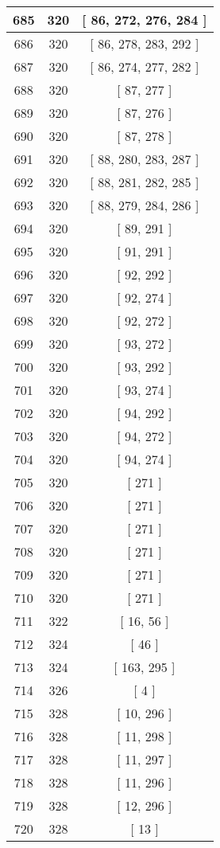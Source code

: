 \begin{center}
\begin{longtable}[H]{|| c c c ||}
685 & 320 & [ 86, 272, 276, 284 ]
\\\hline
686 & 320 & [ 86, 278, 283, 292 ]
\\\hline
687 & 320 & [ 86, 274, 277, 282 ]
\\\hline
688 & 320 & [ 87, 277 ]
\\\hline
689 & 320 & [ 87, 276 ]
\\\hline
690 & 320 & [ 87, 278 ]
\\\hline
691 & 320 & [ 88, 280, 283, 287 ]
\\\hline
692 & 320 & [ 88, 281, 282, 285 ]
\\\hline
693 & 320 & [ 88, 279, 284, 286 ]
\\\hline
694 & 320 & [ 89, 291 ]
\\\hline
695 & 320 & [ 91, 291 ]
\\\hline
696 & 320 & [ 92, 292 ]
\\\hline
697 & 320 & [ 92, 274 ]
\\\hline
698 & 320 & [ 92, 272 ]
\\\hline
699 & 320 & [ 93, 272 ]
\\\hline
700 & 320 & [ 93, 292 ]
\\\hline
701 & 320 & [ 93, 274 ]
\\\hline
702 & 320 & [ 94, 292 ]
\\\hline
703 & 320 & [ 94, 272 ]
\\\hline
704 & 320 & [ 94, 274 ]
\\\hline
705 & 320 & [ 271 ]
\\\hline
706 & 320 & [ 271 ]
\\\hline
707 & 320 & [ 271 ]
\\\hline
708 & 320 & [ 271 ]
\\\hline
709 & 320 & [ 271 ]
\\\hline
710 & 320 & [ 271 ]
\\\hline
711 & 322 & [ 16, 56 ]
\\\hline
712 & 324 & [ 46 ]
\\\hline
713 & 324 & [ 163, 295 ]
\\\hline
714 & 326 & [ 4 ]
\\\hline
715 & 328 & [ 10, 296 ]
\\\hline
716 & 328 & [ 11, 298 ]
\\\hline
717 & 328 & [ 11, 297 ]
\\\hline
718 & 328 & [ 11, 296 ]
\\\hline
719 & 328 & [ 12, 296 ]
\\\hline
720 & 328 & [ 13 ]
\\\hline

\end{longtable}
\end{center}
